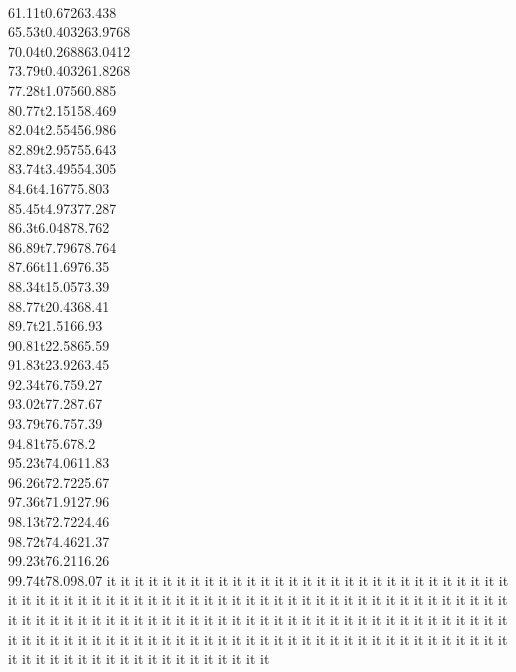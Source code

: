 \documentclass{report}
\begin{document}
{    \\{61.11}t{0.672}{63.438}
    \\{65.53}t{0.4032}{63.9768}
    \\{70.04}t{0.2688}{63.0412}
    \\{73.79}t{0.4032}{61.8268}
    \\{77.28}t{1.075}{60.885}
    \\{80.77}t{2.151}{58.469}
    \\{82.04}t{2.554}{56.986}
    \\{82.89}t{2.957}{55.643}
    \\{83.74}t{3.495}{54.305}
    \\{84.6}t{4.167}{75.803}%
    \\{85.45}t{4.973}{77.287}
    \\{86.3}t{6.048}{78.762}
    \\{86.89}t{7.796}{78.764}
    \\{87.66}t{11.69}{76.35}
    \\{88.34}t{15.05}{73.39}
    \\{88.77}t{20.43}{68.41}
    \\{89.7}t{21.51}{66.93}
    \\{90.81}t{22.58}{65.59}
    \\{91.83}t{23.92}{63.45}
    \\{92.34}t{76.75}{9.27}%
    \\{93.02}t{77.28}{7.67}
    \\{93.79}t{76.75}{7.39}
    \\{94.81}t{75.67}{8.2}
    \\{95.23}t{74.06}{11.83}
    \\{96.26}t{72.72}{25.67}
    \\{97.36}t{71.91}{27.96}
    \\{98.13}t{72.72}{24.46}
    \\{98.72}t{74.46}{21.37}
    \\{99.23}t{76.21}{16.26}
    \\{99.74}t{78.09}{8.07}
    }
  it it it it it it it it it it it it it it it it it it it it it it it it it it 
  it it it it it it it it it it it it it it it it it it it it it it it it it it 
  it it it it it it it it it it it it it it it it it it it it it it it it it it 
  it it it it it it it it it it it it it it it it it it it it it it it it it it 
  it it it it it it it it it it it it it it it it it it it it it it it it it it 
  it it it it it it it it it it it it it it it it it it it it it it it it it it 
\end{document}
